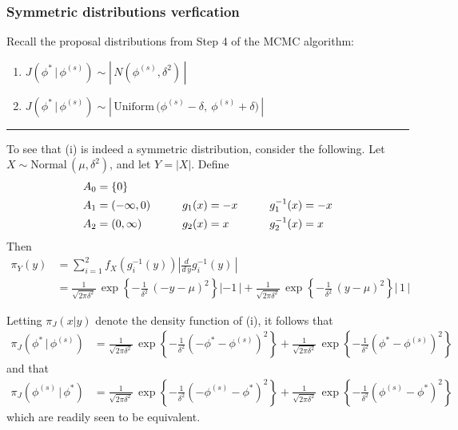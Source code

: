 \documentclass[11pt]{article}
\newcommand{\barS}{\,|\,}
\begin{document}

\subsubsection{Symmetric distributions verfication}

Recall the proposal distributions from Step 4 of the MCMC algorithm:
\begin{enumerate}[label=(\roman*), itemsep=3mm]
\item $ J\left( \phi^* \barS \phi^{(s)} \right) \sim \left|\, N\left( \phi^{(s)}, \delta^2 \right) \,\right| $
\item $ J\left( \phi^* \barS \phi^{(s)} \right) \sim \left|\, \text{Uniform}\, \big( \phi^{(s)} - \delta,~ \phi^{(s)} + \delta \big) \,\right| $
\end{enumerate}

\vspace{0mm} \begin{center} \rule{1.0\textwidth}{0.25mm} \end{center} \vspace{4mm}


\noindent To see that (i) is indeed a symmetric distribution, consider the following.  Let $X \sim \text{Normal}\, (\mu,\delta^2)$, and let $Y = |X|$.  Define
\[ \arraycolsep=5mm \begin{array}{lll}
A_0 = \{0\}       & & \\[1ex]
A_1 = (-\infty,0) & g_1(x) = -x & g_1^{-1}(x) = -x \\[1ex]
A_2 = (0, \infty) &  g_2(x) = x & g_2^{-1}(x) = x
\end{array} \]
Then
\begin{align*}
\pi_Y(y) &= \sum_{i=1}^2 f_X\left( g_i^{-1}(y) \right) \left| \frac{ d }{ d\,y } g_i^{-1}(y) \,\right| \\[1ex]
&= \frac{ 1 }{ \sqrt{ 2\pi\delta^2 } }\, \exp\left\{ - \frac{ 1 }{ \delta^2 }\, (-y - \mu)^2 \right\} | -1 \,| + \frac{ 1 }{ \sqrt{ 2\pi\delta^2 } }\, \exp\left\{ - \frac{ 1 }{ \delta^2 }\, (y - \mu)^2 \right\} |\, 1 \,|
\end{align*} \vspace{4mm}

\noindent Letting $\pi_J \left( x | y \right)$ denote the density function of (i), it follows that 
\begin{align*}
\pi_J \left( \phi^* \barS \phi^{(s)} \right) &= \frac{ 1 }{ \sqrt{ 2\pi\delta^2 } }\, \exp\left\{ - \frac{ 1 }{ \delta^2 } \left(-\phi^* - \phi^{(s)}\right)^2 \right\} + \frac{ 1 }{ \sqrt{ 2\pi\delta^2 } }\, \exp\left\{ - \frac{ 1 }{ \delta^2 } \left(\phi^* - \phi^{(s)}\right)^2 \right\}
\end{align*}
and that
\begin{align*}
\pi_J \left( \phi^{(s)} \barS \phi^* \right) &= \frac{ 1 }{ \sqrt{ 2\pi\delta^2 } }\, \exp\left\{ - \frac{ 1 }{ \delta^2 } \left(-\phi^{(s)} - \phi^*\right)^2 \right\} + \frac{ 1 }{ \sqrt{ 2\pi\delta^2 } }\, \exp\left\{ - \frac{ 1 }{ \delta^2 } \left(\phi^{(s)} - \phi^*\right)^2 \right\}
\end{align*}
which are readily seen to be equivalent.
\end{document}
